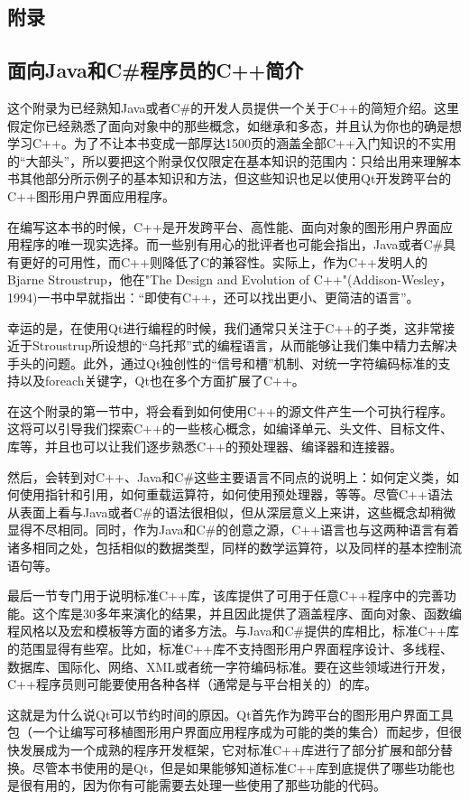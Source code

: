 \documentclass[11pt,oneside]{book}
\begin{document}
\begin{common-format}
\part{附录}
\chapter{面向Java和C\#{}程序员的C++简介}
这个附录为已经熟知Java或者C\#{}的开发人员提供一个关于C++的简短介绍。这里假定你已经熟悉了面向对象中的那些概念，如继承和多态，并且认为你也的确是想学习C++。为了不让本书变成一部厚达1500页的涵盖全部C++入门知识的不实用的“大部头”，所以要把这个附录仅仅限定在基本知识的范围内：只给出用来理解本书其他部分所示例子的基本知识和方法，但这些知识也足以使用Qt开发跨平台的C++图形用户界面应用程序。

在编写这本书的时候，C++是开发跨平台、高性能、面向对象的图形用户界面应用程序的唯一现实选择。而一些别有用心的批评者也可能会指出，Java或者C\#{}具有更好的可用性，而C++则降低了C的兼容性。实际上，作为C++发明人的Bjarne Stroustrup，他在"The Design and Evolution of C++"(Addison-Wesley，1994)一书中早就指出：“即使有C++，还可以找出更小、更简洁的语言”。

幸运的是，在使用Qt进行编程的时候，我们通常只关注于C++的子类，这非常接近于Stroustrup所设想的“乌托邦”式的编程语言，从而能够让我们集中精力去解决手头的问题。此外，通过Qt独创性的“信号和槽”机制、对统一字符编码标准的支持以及foreach关键字，Qt也在多个方面扩展了C++。

在这个附录的第一节中，将会看到如何使用C++的源文件产生一个可执行程序。这将可以引导我们探索C++的一些核心概念，如编译单元、头文件、目标文件、库等，并且也可以让我们逐步熟悉C++的预处理器、编译器和连接器。

然后，会转到对C++、Java和C\#{}这些主要语言不同点的说明上：如何定义类，如何使用指针和引用，如何重载运算符，如何使用预处理器，等等。尽管C++语法从表面上看与Java或者C\#{}的语法很相似，但从深层意义上来讲，这些概念却稍微显得不尽相同。同时，作为Java和C\#{}的创意之源，C++语言也与这两种语言有着诸多相同之处，包括相似的数据类型，同样的数学运算符，以及同样的基本控制流语句等。

最后一节专门用于说明标准C++库，该库提供了可用于任意C++程序中的完善功能。这个库是30多年来演化的结果，并且因此提供了涵盖程序、面向对象、函数编程风格以及宏和模板等方面的诸多方法。与Java和C\#{}提供的库相比，标准C++库的范围显得有些窄。比如，标准C++库不支持图形用户界面程序设计、多线程、数据库、国际化、网络、XML或者统一字符编码标准。要在这些领域进行开发，C++程序员则可能要使用各种各样（通常是与平台相关的）的库。

这就是为什么说Qt可以节约时间的原因。Qt首先作为跨平台的图形用户界面工具包（一个让编写可移植图形用户界面应用程序成为可能的类的集合）而起步，但很快发展成为一个成熟的程序开发框架，它对标准C++库进行了部分扩展和部分替换。尽管本书使用的是Qt，但是如果能够知道标准C++库到底提供了哪些功能也是很有用的，因为你有可能需要去处理一些使用了那些功能的代码。


\end{common-format}
\end{document}
